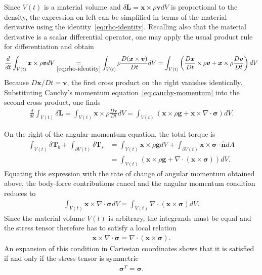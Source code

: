 Since $V(t)$ is a material volume and $\delta\bm{L}=\bm{x}\times\rho\bm{v}dV$ is proportional to the density, the expression on left can be simplified in terms of the material derivative using the identity~\eqref{eq:rho-identity}. Recalling also that the material derivative is a scalar differential operator, one may apply the usual product rule for differentiation and obtain
\begin{align}
    \frac{d}{dt}\int_{V(t)}\bm{x}\times\rho\bm{v}dV\underset{\eqref{eq:rho-identity}}{=}\int_{V(t)}\rho\frac{D(\bm{x}\times\bm{v})}{Dt}dV=\int_{V(t)}\left(\frac{D\bm{x}}{Dt}\times\rho\bm{v}+\bm{x}\times\rho\frac{D\bm{v}}{Dt}\right)dV
\end{align}
Because $D\bm{x}/Dt=\bm{v}$, the first cross product on the right vanishes identically. Substituting Cauchy's momentum equation~\eqref{eq:cauchy-momentum} into the second cross product, one finds
\begin{align}
    \frac{d}{dt}\int_{V(t)}\delta\bm{L}=\int_{V(t)}\bm{x}\times\rho\frac{D\bm{v}}{Dt}dV=\int_{V(t)}\left(\bm{x}\times\rho\bm{g}+\bm{x}\times\nabla\cdot\bm{\sigma}\right)dV.
\end{align}

On the right of the angular momentum equation, the total torque is
\begin{align}
    \int_{V(t)}\delta\bm{T}_b+\int_{\partial V(t)}\delta\bm{T}_s&=\int_{V(t)}\bm{x}\times\rho\bm{g}dV+\int_{\partial V(t)}\bm{x}\times\bm{\sigma}\cdot\bm{\hat{n}}dA\nonumber\\
    &=\int_{V(t)}(\bm{x}\times\rho\bm{g}+\nabla\cdot(\bm{x}\times\bm{\sigma}))dV.
\end{align}
Equating this expression with the rate of change of angular momentum obtained above, the body-force contributions cancel and the angular momentum condition reduces to
\begin{align}
    \int_{V(t)}\bm{x}\times\nabla\cdot\bm{\sigma}dV=\int_{V(t)}\nabla\cdot(\bm{x}\times\bm{\sigma})dV.
\end{align}
Since the material volume $V(t)$ is arbitrary, the integrands must be equal and the stress tensor therefore has to satisfy a local relation
\begin{align}
    \bm{x}\times\nabla\cdot\bm{\sigma}=\nabla\cdot(\bm{x}\times\bm{\sigma}).
\end{align}
An expansion of this condition in Cartesian coordinates shows that it is satisfied if and only if the stress tensor is symmetric
\begin{align}
    \bm{\sigma}^T=\bm{\sigma}.
\end{align}

